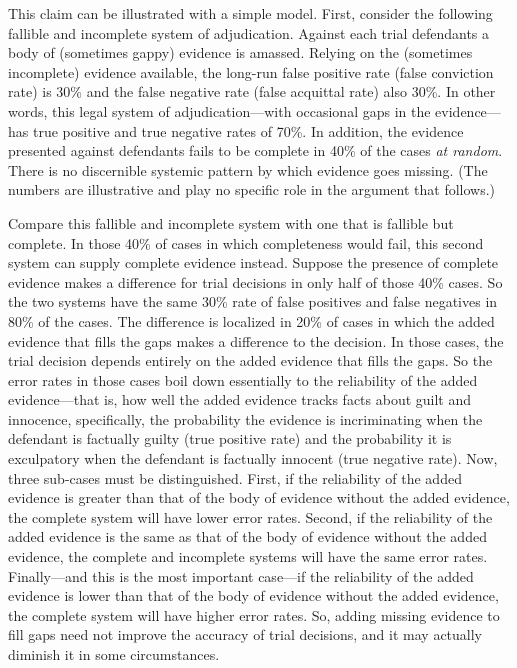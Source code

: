 \documentclass[
  10pt,
  dvipsnames,enabledeprecatedfontcommands]{scrartcl}
\begin{document}
This claim can be illustrated with a simple model. First, consider the
following fallible and incomplete system of adjudication. Against each
trial defendants a body of (sometimes gappy) evidence is amassed.
Relying on the (sometimes incomplete) evidence available, the long-run
false positive rate (false conviction rate) is 30\% and the false
negative rate (false acquittal rate) also 30\%. In other words, this
legal system of adjudication---with occasional gaps in the
evidence---has true positive and true negative rates of 70\%. In
addition, the evidence presented against defendants fails to be complete
in 40\% of the cases \emph{at random}. There is no discernible systemic
pattern by which evidence goes missing. (The numbers are illustrative
and play no specific role in the argument that follows.)

Compare this fallible and incomplete system with one that is fallible
but complete. In those 40\% of cases in which completeness would fail,
this second system can supply complete evidence instead. Suppose the
presence of complete evidence makes a difference for trial decisions in
only half of those 40\% cases. So the two systems have the same 30\%
rate of false positives and false negatives in 80\% of the cases. The
difference is localized in 20\% of cases in which the added evidence
that fills the gaps makes a difference to the decision. In those cases,
the trial decision depends entirely on the added evidence that fills the
gaps. So the error rates in those cases boil down essentially to the
reliability of the added evidence---that is, how well the added evidence
tracks facts about guilt and innocence, specifically, the probability
the evidence is incriminating when the defendant is factually guilty
(true positive rate) and the probability it is exculpatory when the
defendant is factually innocent (true negative rate). Now, three
sub-cases must be distinguished. First, if the reliability of the added
evidence is greater than that of the body of evidence without the added
evidence, the complete system will have lower error rates. Second, if
the reliability of the added evidence is the same as that of the body of
evidence without the added evidence, the complete and incomplete systems
will have the same error rates. Finally---and this is the most important
case---if the reliability of the added evidence is lower than that of
the body of evidence without the added evidence, the complete system
will have higher error rates. So, adding missing evidence to fill gaps
need not improve the accuracy of trial decisions, and it may actually
diminish it in some circumstances.
\end{document}
